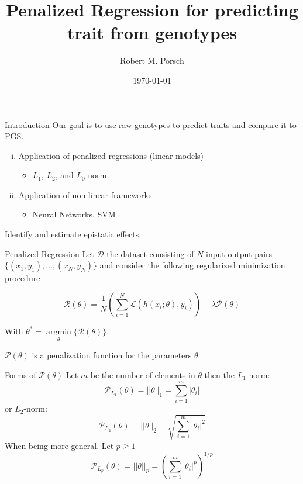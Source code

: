 \documentclass{beamer}
\title{Penalized Regression for predicting trait from genotypes}
\date{\today}
\author{Robert M. Porsch}
\institute{Center of Genomic Science}
\DeclareMathOperator*{\argmin}{argmin}
\begin{document}
\maketitle

\begin{frame}[t]{Introduction}
  Our goal is to use raw genotypes to predict traits and compare it to PGS\@.
  \begin{enumerate}[(i)]
    \item Application of penalized regressions (linear models)
      \begin{itemize}
        \item $L_1$, $L_2$, and $L_0$ norm
      \end{itemize}
    \item Application of non-linear frameworks
      \begin{itemize}
        \item Neural Networks, SVM
      \end{itemize}
  \end{enumerate}
  Identify and estimate epistatic effects.
\end{frame}

\begin{frame}[t]{Penalized Regression}
  Let $\mathcal{D}$ the dataset consisting of $N$ input-output pairs $\{(x_1, y_1), \ldots, (x_N, y_N)\}$ and consider the following regularized minimization procedure

  \begin{equation} 
    \mathcal{R}(\theta) = \frac{1}{N} ( \sum^N_{i=1} \mathcal{L}(h(x_i; \theta), y_i)) + \lambda\mathcal{P}(\theta)
  \end{equation}

  With $\theta^* = \underset{\theta}{\argmin}\{\mathcal{R}(\theta)\}$.

  $\mathcal{P}(\theta)$ is a penalization function for the parameters $\theta$.
\end{frame}

\begin{frame}[t]{Forms of $\mathcal{P}(\theta)$}
  Let $m$ be the number of elements in $\theta$ then the $L_1$-norm:
  \begin{equation}
    \mathcal{P}_{L_1}(\theta) = ||\theta||_1 = \sum^{m}_{i=1} |\theta_i|
  \end{equation}
  or $L_2$-norm:
  \begin{equation}
  \mathcal{P}_{L_2}(\theta) = ||\theta||_2 =  \sqrt{\sum^{m}_{i=1} |\theta_i|^2}
  \end{equation}
  When being more general. Let $p \geq 1$
  \begin{equation}
    \mathcal{P}_{L_p}(\theta) = ||\theta||_p = (\sum^{m}_{i=1} |\theta_i|^{p})^{1/p}
  \end{equation}
\end{frame}
\end{document}
